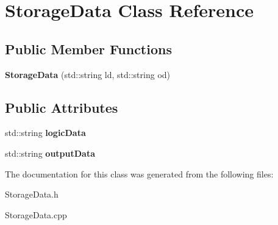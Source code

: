 \hypertarget{class_storage_data}{}\section{Storage\+Data Class Reference}
\label{class_storage_data}
\subsection*{Public Member Functions}
\begin{DoxyCompactItemize}
\item 
\mbox{\label{class_storage_data_aef692cafa14b73abddaac22d527bd6de}} 
{\bfseries Storage\+Data} (std\+::string ld, std\+::string od)
\end{DoxyCompactItemize}
\subsection*{Public Attributes}
\begin{DoxyCompactItemize}
\item 
\mbox{\label{class_storage_data_adf525b90e94d0a64af74653b04ef9995}} 
std\+::string {\bfseries logic\+Data}
\item 
\mbox{\label{class_storage_data_adb52a97f028b7b65977a00df186f9cb8}} 
std\+::string {\bfseries output\+Data}
\end{DoxyCompactItemize}


The documentation for this class was generated from the following files\+:\begin{DoxyCompactItemize}
\item 
Storage\+Data.\+h\item 
Storage\+Data.\+cpp\end{DoxyCompactItemize}
